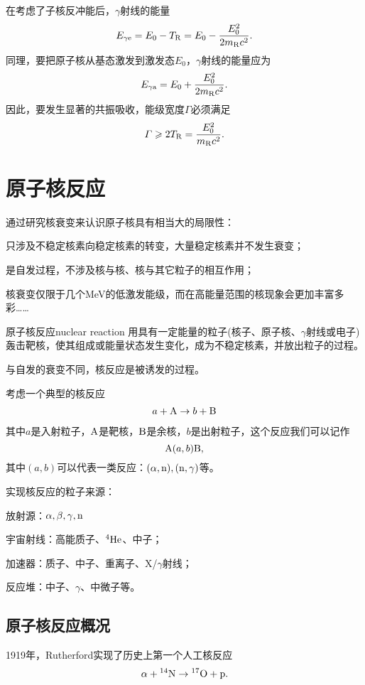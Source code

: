 在考虑了子核反冲能后，$\gamma$射线的能量
\[
	E_{\gamma\mathrm e}=E_0-T_{\mathrm{R}}=E_0-\frac{E_0^2}{2m_{\mathrm{R}}c^2}.
\]
同理，要把原子核从基态激发到激发态$E_0$，$\gamma$射线的能量应为
\[
	E_{\gamma\mathrm a}=E_0+\frac{E_0^2}{2m_{\mathrm{R}}c^2}.
\]
因此，要发生显著的共振吸收，能级宽度$\varGamma$必须满足
\begin{align}
	\varGamma\geqslant 2T_{\mathrm{R}}=\frac{E_0^2}{m_{\mathrm{R}}c^2}.
\end{align}
\clearpage
\section{原子核反应}
通过研究核衰变来认识原子核具有相当大的局限性：
\begin{compactitem}
	\item 只涉及不稳定核素向稳定核素的转变，大量稳定核素并不发生衰变；
	\item 是自发过程，不涉及核与核、核与其它粒子的相互作用；
	\item 核衰变仅限于几个MeV的低激发能级，而在高能量范围的核现象会更加丰富多彩……
\end{compactitem} 

\begin{definition}{原子核反应}{nuclear reaction}
	用具有一定能量的粒子(核子、原子核、$\gamma$射线或电子)轰击靶核，使其组成或能量状态发生变化，成为不稳定核素，并放出粒子的过程。
\end{definition}
与自发的衰变不同，核反应是被诱发的过程。

考虑一个典型的核反应
\begin{align}\label{AabB}
	a+\mathrm{A}\to b+\mathrm{B}
\end{align}
其中$a$是入射粒子，$\mathrm{A}$是靶核，$\mathrm{B}$是余核，$b$是出射粒子，这个反应我们可以记作
\[
	{\mathrm{A}}(a,b){\mathrm{B}},
\]
其中$(a,b)$可以代表一类反应：$(\alpha,\mathrm n),(\mathrm n,\gamma)$等。

实现核反应的粒子来源：
\begin{compactitem}
	\item 放射源：$\alpha,\beta,\gamma,\mathrm n$
	\item 宇宙射线：高能质子、${^{4}\mathrm{He}}$、中子；
	\item 加速器：质子、中子、重离子、X/$\gamma$射线；
	\item 反应堆：中子、$\gamma$、中微子等。
\end{compactitem}
\subsection{原子核反应概况}
1919年，Rutherford实现了历史上第一个人工核反应
\[
	\alpha+{^{14}\mathrm{N}}\to{^{17}\mathrm{O}}+\mathrm p.
\]


